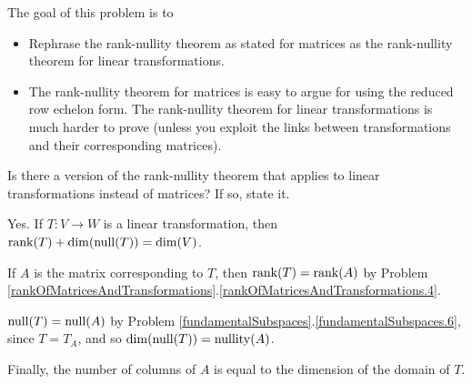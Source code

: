 \documentclass{problemset}
\begin{document}
	\question
	\begin{annotation}
		\begin{goals}

			The goal of this problem is to
			\begin{itemize}
				\item Rephrase the rank-nullity theorem as stated for matrices as
					the rank-nullity theorem for linear transformations.
			\end{itemize}
		\end{goals}

		\begin{notes}
			\begin{itemize}
				\item The rank-nullity theorem for matrices is easy to argue for using
					the reduced row echelon form. The rank-nullity theorem for 
					linear transformations is much harder to prove (unless you exploit
					the links between transformations and their corresponding matrices).
			\end{itemize}
		\end{notes}
	\end{annotation}
	\begin{parts}
		\item Is there a version of the rank-nullity theorem that applies to linear
			transformations instead of matrices? If so, state it.
			\begin{solution}
				Yes. If $T:V\to W$ is a linear transformation, then
				$\operatorname{rank}(T)+\operatorname{dim}(\operatorname{null}(T))=\operatorname{dim}(V)$.

				If $A$ is the matrix corresponding to $T$, then $\operatorname{rank}(T)=\operatorname{rank}(A)$
				by Problem \ref{rankOfMatricesAndTransformations}.\ref{rankOfMatricesAndTransformations.4}.

				$\operatorname{null}(T)=\operatorname{null}(A)$ by Problem \ref{fundamentalSubspaces}.\ref{fundamentalSubspaces.6},
				since $T=T_A$, and so $\operatorname{dim}(\operatorname{null}(T))=\operatorname{nullity}(A)$.

				Finally, the number of columns of $A$ is equal to the dimension
				of the domain of $T$.
			\end{solution}
	\end{parts}
\end{document}
